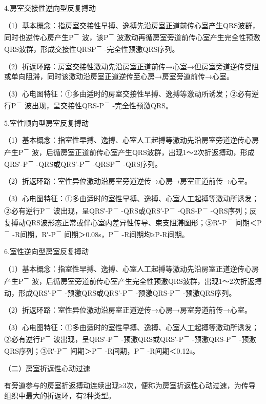 4.房室交接性逆向型反复搏动

（1）基本概念：指房室交接性早搏、逸搏先沿房室正道前传心室产生QRS波群，同时也逆传心房产生P\textsuperscript{－}
波，该P\textsuperscript{－}
波激动再循房室旁道前传心室产生完全性预激QRS波群，形成交接性QRSP\textsuperscript{－}
-完全性预激QRS序列。

（2）折返环路：房室交接性激动先沿房室正道前传→心室→但房室旁道逆传受阻或单向阻滞，同时该激动沿房室正道逆传至心房→房室旁道前传→心室。

（3）心电图特征：①多由适时的房室交接性早搏、逸搏等激动所诱发；②必有逆行P\textsuperscript{－}
波出现，呈交接性QRS-P\textsuperscript{－} -完全性预激QRS。

5.室性顺向型房室反复搏动

（1）基本概念：指室性早搏、逸搏、心室人工起搏等激动先沿房室旁道逆传心房产生P\textsuperscript{－}
波，后循房室正道前传心室产生QRS波群，出现1～2次折返搏动，形成QRS′-P\textsuperscript{－}
-QRS或QRS′-P\textsuperscript{－} -QRSP\textsuperscript{－} -QRS序列。

（2）折返环路：室性异位激动沿房室旁道逆传→心房→房室正道前传→心室。

（3）心电图特征：①多由适时的室性早搏、逸搏、心室人工起搏等激动所诱发；②必有逆行P\textsuperscript{－}
波出现，呈QRS′-P\textsuperscript{－} -QRS或QRS′-P\textsuperscript{－}
-QRS-P\textsuperscript{－}
-QRS序列；反复搏动QRS波形态正常或伴心室内差异性传导、束支阻滞图形；③R′-P\textsuperscript{－}
间期＜P\textsuperscript{－} -R间期，R′-P\textsuperscript{－}
间期＞0.08s，P\textsuperscript{－} -R间期均≥P-R间期。

6.室性逆向型房室反复搏动

（1）基本概念：指室性早搏、逸搏、心室人工起搏等激动先沿房室正道逆传心房产生P\textsuperscript{－}
波，后循房室旁道前传心室产生完全性预激QRS波群，出现1～2次折返搏动，形成QRS′-P\textsuperscript{－}
-预激QRS或QRS′-P\textsuperscript{－} -预激QRS-P\textsuperscript{－}
-预激QRS序列。

（2）折返环路：室性异位激动沿房室正道逆传→心房→房室旁道前传→心室。

（3）心电图特征：①多由适时的室性早搏、逸搏、心室人工起搏等激动所诱发；②必有逆行P\textsuperscript{－}
波出现，呈QRS′-P\textsuperscript{－}
-预激QRS或QRS′-P\textsuperscript{－} -预激QRS-P\textsuperscript{－}
-预激QRS序列；③R′-P\textsuperscript{－} 间期＞P\textsuperscript{－}
-R间期，P\textsuperscript{－} -R间期＜0.12s。

（二）房室折返性心动过速

有旁道参与的房室折返搏动连续出现≥3次，便称为房室折返性心动过速，为传导组织中最大的折返环，有2种类型。

